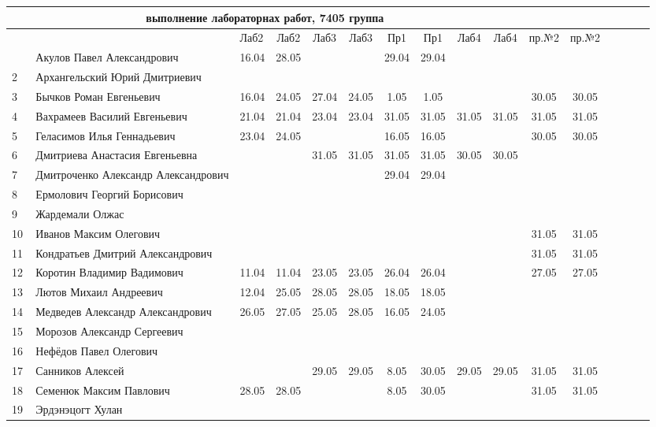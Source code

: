\documentclass[a4paper,11pt]{article}
\begin{document}
\newpage
{}
\recalctypearea
%
\hspace{-6.4cm} %
\begin{tabular}{l|llccccccccccccc}
\multicolumn{10}{c}{выполнение лабораторнах работ, 7405 группа} \\
\toprule
	                                  &&Лаб2&Лаб2 & Лаб3&Лаб3& Пр1&Пр1& Лаб4&Лаб4&пр.№2&пр.№2\\
\midrule
\,&Акулов Павел Александрович             &16.04&28.05&     &     &29.04&29.04&&&\\
2\,&Архангельский Юрий Дмитриевич         &     &     &     &     &&&&\\
3\,&Бычков Роман Евгеньевич               &16.04&24.05&27.04&24.05& 1.05& 1.05&&&30.05&30.05\\
4\,&Вахрамеев Василий Евгеньевич          &21.04&21.04&23.04&23.04&31.05&31.05&31.05 &31.05&31.05&31.05\\
5\,&Геласимов Илья Геннадьевич            &23.04&24.05&     &     &16.05&16.05&      &     &30.05&30.05\\
\midrule
6\,&Дмитриева Анастасия Евгеньевна        &     &     &31.05&31.05&31.05&31.05&30.05&30.05&\\
7\,&Дмитроченко Александр Александрович   &     &     &     &     &29.04&29.04&&&\\
8\,&Ермолович Георгий Борисович           &     &     &     &     &&&&\\
9\,&Жардемали Олжас                       &     &     &     &     &&&&\\
10\,&Иванов Максим Олегович               &     &     &     &     &     &     &     &      &31.05&31.05\\
\midrule
11\,&Кондратьев Дмитрий Александрович     &     &     &     &     &     &     &     &     &31.05&31.05\\
12\,&Коротин Владимир Вадимович           &11.04&11.04&23.05&23.05&26.04&26.04&     &     &27.05&27.05&\\
13\,&Лютов Михаил Андреевич               &12.04&25.05&28.05&28.05&18.05&18.05&&\\
14\,&Медведев Александр Александрович     &26.05&27.05&25.05&28.05&16.05&24.05&&\\
15\,&Морозов Александр Сергеевич          &&&&&&&&\\
\midrule
16\,&Нефёдов Павел Олегович               &&&&&&&&\\
17\,&Санников Алексей                     &     &     &29.05&29.05& 8.05&30.05&29.05&29.05&31.05&31.05\\
18\,&Семенюк Максим Павлович              &28.05&28.05&     &     & 8.05&30.05&     &     &31.05&31.05\\
19\,&Эрдэнэцогт Хулан                     &&&&&&&&\\
\bottomrule
\end{tabular}
\end{document}
